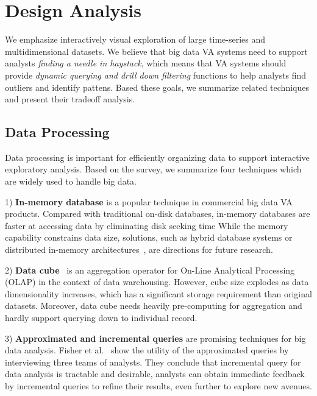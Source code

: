 \section{Design Analysis}
We emphasize interactively visual exploration of large time-series and multidimensional datasets. 
We believe that big data VA systems need to support analysts \textsl{finding a needle in haystack}, which means that VA systems should provide \textsl{dynamic querying and drill down filtering} functions to help analysts find outliers and identify pattens. 
Based these goals, we summarize  related techniques and present their tradeoff analysis. 

\subsection{Data Processing}
Data processing is important for efficiently organizing data to support interactive exploratory analysis. Based on the survey, we summarize four techniques which are widely used to handle big data.

1) \textbf{In-memory database} is a popular technique in commercial big data VA products. 
Compared with traditional on-disk databases, in-memory databases are faster at accessing data by eliminating disk seeking time
While the memory capability constrains  data size, solutions, such as hybrid database systems or distributed in-memory architectures~\cite{Kallman:2008},  are directions for future research.  

2) \textbf{Data cube}~\cite{gray} is an aggregation operator for On-Line Analytical Processing (OLAP) in the context of data warehousing. 
However, cube size explodes as data dimensionality increases, which has a significant storage requirement than original datasets. 
Moreover, data cube needs heavily pre-computing for aggregation and hardly support  querying down to individual record.

3) \textbf{Approximated and incremental queries} are promising techniques for big data analysis. 
Fisher et al.~\cite{FisherCHI2012} show the utility of the approximated queries by interviewing three teams of analysts.
They conclude that incremental query for data analysis is tractable and desirable, analysts can obtain immediate feedback by incremental queries to refine their results, even further to explore new avenues.  

